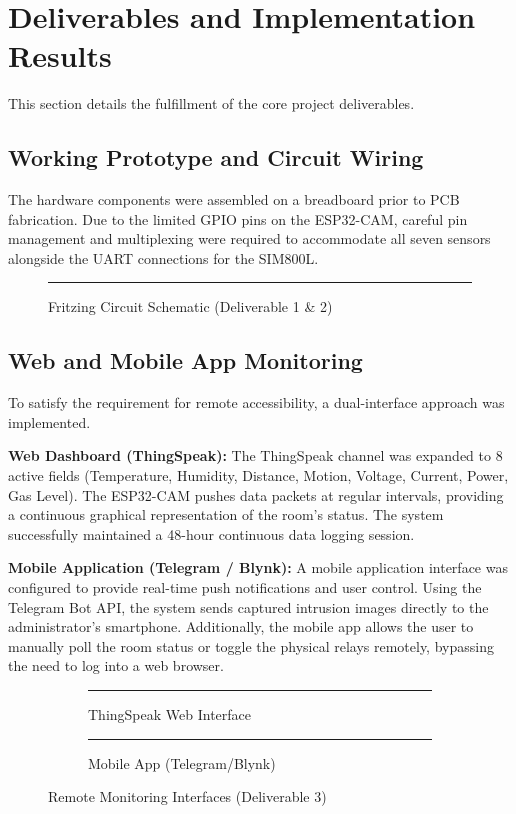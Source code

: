 \documentclass[12pt,a4paper]{article}
\begin{document}
\section{Deliverables and Implementation Results}
This section details the fulfillment of the core project deliverables.

\subsection{Working Prototype and Circuit Wiring}
The hardware components were assembled on a breadboard prior to PCB fabrication. Due to the limited GPIO pins on the ESP32-CAM, careful pin management and multiplexing were required to accommodate all seven sensors alongside the UART connections for the SIM800L. 

\begin{figure}[H]
    \centering
    \rule{8cm}{5cm} %
    \caption{Fritzing Circuit Schematic (Deliverable 1 \& 2)}
    \label{fig:fritzing}
\end{figure}

\subsection{Web and Mobile App Monitoring}
To satisfy the requirement for remote accessibility, a dual-interface approach was implemented. 

\textbf{Web Dashboard (ThingSpeak):} The ThingSpeak channel was expanded to 8 active fields (Temperature, Humidity, Distance, Motion, Voltage, Current, Power, Gas Level). The ESP32-CAM pushes data packets at regular intervals, providing a continuous graphical representation of the room's status. The system successfully maintained a 48-hour continuous data logging session.

\textbf{Mobile Application (Telegram / Blynk):} A mobile application interface was configured to provide real-time push notifications and user control. Using the Telegram Bot API, the system sends captured intrusion images directly to the administrator's smartphone. Additionally, the mobile app allows the user to manually poll the room status or toggle the physical relays remotely, bypassing the need to log into a web browser.

\begin{figure}[H]
    \centering
    \begin{subfigure}{0.45\textwidth}
        \centering
        \rule{6cm}{4cm} %
        \caption{ThingSpeak Web Interface}
    \end{subfigure}
    \hfill
    \begin{subfigure}{0.45\textwidth}
        \centering
        \rule{6cm}{4cm} %
        \caption{Mobile App (Telegram/Blynk)}
    \end{subfigure}
    \caption{Remote Monitoring Interfaces (Deliverable 3)}
    \label{fig:apps}
\end{figure}
\end{document}
